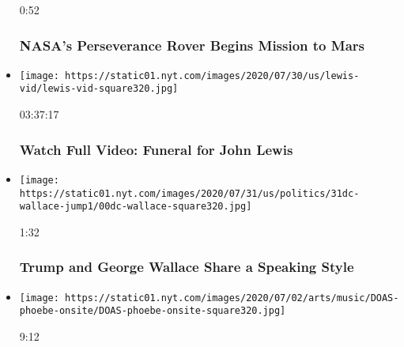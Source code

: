 \begin{itemize}
  0:52

  \hypertarget{nasas-perseverance-rover-begins-mission-to-mars}{%
  \subsubsection{NASA's Perseverance Rover Begins Mission to
  Mars}\label{nasas-perseverance-rover-begins-mission-to-mars}}
\item
  \href{https://www.nytimes.com/video/us/politics/100000007264379/john-lewis-funeral.html?action=click\&module=video-series-bar\&region=header\&pgtype=Article\&playlistId=video/latest-video}{}

  \texttt{[image: https://static01.nyt.com/images/2020/07/30/us/lewis-vid/lewis-vid-square320.jpg]}

  03:37:17

  \hypertarget{watch-full-video-funeral-for-john-lewis}{%
  \subsubsection{Watch Full Video: Funeral for John
  Lewis}\label{watch-full-video-funeral-for-john-lewis}}
\item
  \href{https://www.nytimes.com/video/us/politics/100000007255898/trump-george-wallace-rhetoric.html?action=click\&module=video-series-bar\&region=header\&pgtype=Article\&playlistId=video/latest-video}{}

  \texttt{[image: https://static01.nyt.com/images/2020/07/31/us/politics/31dc-wallace-jump1/00dc-wallace-square320.jpg]}

  1:32

  \hypertarget{trump-and-george-wallace-share-a-speaking-style}{%
  \subsubsection{Trump and George Wallace Share a Speaking
  Style}\label{trump-and-george-wallace-share-a-speaking-style}}
\item
  \href{https://www.nytimes.com/video/arts/music/100000007258359/phoebe-bridgers-kyoto.html?action=click\&module=video-series-bar\&region=header\&pgtype=Article\&playlistId=video/latest-video}{}

  \texttt{[image: https://static01.nyt.com/images/2020/07/02/arts/music/DOAS-phoebe-onsite/DOAS-phoebe-onsite-square320.jpg]}

  9:12

  \hypertarget{how-to-convince-phoebe-bridgers-to-write-a-rock-song}{%
}
\end{itemize}
